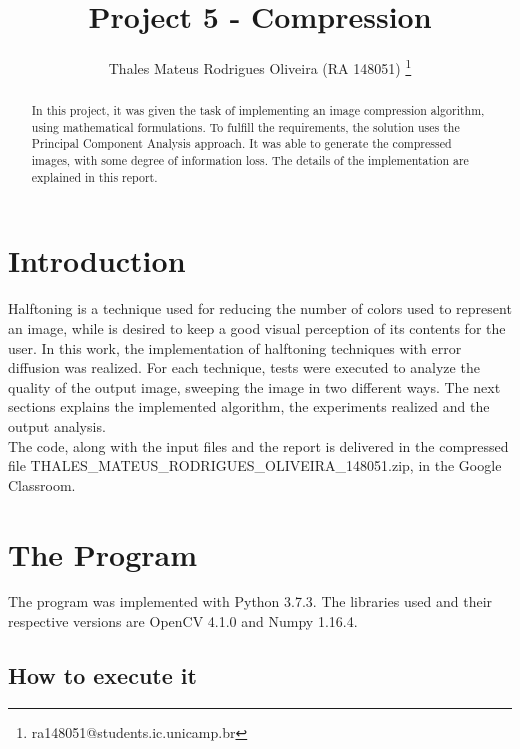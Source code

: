\documentclass[]{IEEEtran}
\begin{document}
  \title{Project 5 - Compression}
  \author{Thales Mateus Rodrigues Oliveira (RA 148051)
    \thanks{ra148051@students.ic.unicamp.br}
  }
  \maketitle
  
  \begin{abstract}
    In this project, it was given the task of implementing an image compression algorithm, using mathematical formulations. To fulfill the requirements, the solution uses the Principal Component Analysis approach. It was able to generate the compressed images, with some degree of information loss. The details of the implementation are explained in this report.
  \end{abstract}
  
\section{Introduction}
Halftoning is a technique used for reducing the number of colors used to represent an image, while is desired to keep a good visual perception of its contents for the user. In this work, the implementation of halftoning techniques with error diffusion was realized. For each technique, tests were executed to analyze the quality of the output image, sweeping the image in two different ways. The next sections explains the implemented algorithm, the experiments realized and the output analysis.
\\
The code, along with the input files and the report is delivered in the compressed file THALES\_MATEUS\_RODRIGUES\_OLIVEIRA\_148051.zip, in the Google Classroom.
\section{The Program}
 
The program was implemented with Python 3.7.3. The libraries used and their respective versions are OpenCV 4.1.0 and Numpy 1.16.4.

\subsection{How to execute it}
\end{document}
